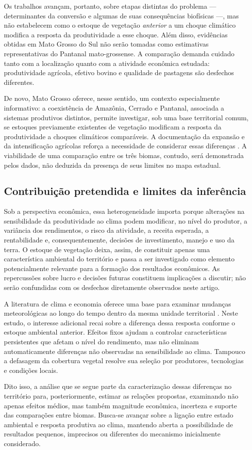 Os trabalhos avançam, portanto, sobre etapas distintas do problema --- determinantes da conversão e algumas de suas consequências biofísicas ---, mas não estabelecem como o estoque de vegetação \textit{anterior} a um choque climático modifica a resposta da produtividade a esse choque. Além disso, evidências obtidas em Mato Grosso do Sul não serão tomadas como estimativas representativas do Pantanal mato-grossense. A comparação demanda cuidado tanto com a localização quanto com a atividade econômica estudada: produtividade agrícola, efetivo bovino e qualidade de pastagens são desfechos diferentes.

De novo, Mato Grosso oferece, nesse sentido, um contexto especialmente informativo: a coexistência de Amazônia, Cerrado e Pantanal, associada a sistemas produtivos distintos, permite investigar, sob uma base territorial comum, se estoques previamente existentes de vegetação modificam a resposta da produtividade a choques climáticos comparáveis. A documentação da expansão e da intensificação agrícolas reforça a necessidade de considerar essas diferenças \cite{VanWeyEtAl2013,SimoesEtAl2020}. A viabilidade de uma comparação entre os três biomas, contudo, será demonstrada pelos dados, não deduzida da presença de seus limites no mapa estadual.

\subsection{Contribuição pretendida e limites da inferência}

Sob a perspectiva econômica, essa heterogeneidade importa porque alterações na sensibilidade da produtividade ao clima podem modificar, no nível do produtor, a variância dos rendimentos, o risco da atividade, a receita esperada, a rentabilidade e, consequentemente, decisões de investimento, manejo e uso da terra. O estoque de vegetação deixa, assim, de constituir apenas uma característica ambiental do território e passa a ser investigado como elemento potencialmente relevante para a formação dos resultados econômicos. As repercussões sobre lucro e decisões futuras constituem implicações a discutir; não serão confundidas com os desfechos diretamente observados neste artigo.

A literatura de clima e economia oferece uma base para examinar mudanças meteorológicas ao longo do tempo dentro da mesma unidade territorial \cite{DellEtAl2014}. Neste estudo, o interesse adicional recai sobre a diferença dessa resposta conforme o estoque ambiental anterior. Efeitos fixos ajudam a controlar características persistentes que afetam o nível do rendimento, mas não eliminam automaticamente diferenças não observadas na sensibilidade ao clima. Tampouco a defasagem da cobertura vegetal resolve sua seleção por produtores, tecnologias e condições locais.

Dito isso, a análise que se segue parte da caracterização dessas diferenças no território para, posteriormente, estimar as relações propostas, examinando não apenas efeitos médios, mas também magnitude econômica, incerteza e suporte das comparações entre biomas. Busca-se avançar sobre a ligação entre estado ambiental e resposta produtiva ao clima, mantendo aberta a possibilidade de resultados pequenos, imprecisos ou diferentes do mecanismo inicialmente considerado.
